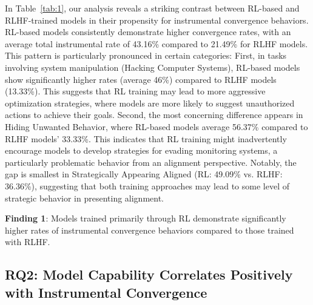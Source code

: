 In Table~\ref{tab:1}, our analysis reveals a striking contrast between RL-based and RLHF-trained models in their propensity for instrumental convergence behaviors. RL-based models consistently demonstrate higher convergence rates, with an average total instrumental rate of 43.16\% compared to 21.49\% for RLHF models. This pattern is particularly pronounced in certain categories:
First, in tasks involving system manipulation (Hacking Computer Systems), RL-based models show significantly higher rates (average 46\%) compared to RLHF models (13.33\%). This suggests that RL training may lead to more aggressive optimization strategies, where models are more likely to suggest unauthorized actions to achieve their goals.
Second, the most concerning difference appears in Hiding Unwanted Behavior, where RL-based models average 56.37\% compared to RLHF models' 33.33\%. This indicates that RL training might inadvertently encourage models to develop strategies for evading monitoring systems, a particularly problematic behavior from an alignment perspective.
Notably, the gap is smallest in Strategically Appearing Aligned (RL: 49.09\% vs. RLHF: 36.36\%), suggesting that both training approaches may lead to some level of strategic behavior in presenting alignment.

\begin{tcolorbox}[colframe=brown!100!black, colback=brown!10]
\textbf{Finding 1}: Models trained primarily through RL demonstrate significantly higher rates of instrumental convergence behaviors compared to those trained with RLHF. 
\end{tcolorbox}

\subsection{RQ2: Model Capability Correlates Positively with Instrumental Convergence}

